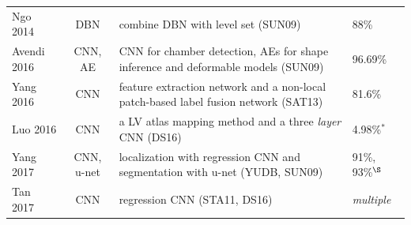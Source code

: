 \documentclass[journal]{IEEEtran}
\begin{document}
\begin{table}[!t]
\begin{minipage}{\textwidth}
\begin{tabularx}{\textwidth}{l c l l}
			Ngo 2014\cite{anh2014fully}                & DBN            & combine DBN with level set (SUN09)                                                        & 88\%                                                                                                                                                                                                                                           \\
			Avendi 2016\cite{avendi2016combined}       & CNN, AE        & CNN for chamber detection, AEs for shape inference and deformable models (SUN09)          & 96.69\%                                                                                                                                                                                                                                        \\
			Yang 2016\cite{yang2016deep}               & CNN            & feature extraction network and a non-local patch-based label fusion network (SAT13)       & 81.6\%                                                                                                                                                                                                                                         \\
			Luo 2016\cite{luo2016cardiac}              & CNN            & a LV atlas mapping method and a three \textit{layer} CNN (DS16)                           & 4.98\%$^*$                                                                                                                                                                                                                                     \\
			Yang 2017\cite{yang2017deep}               & CNN, u-net     & localization with regression CNN and segmentation with u-net (YUDB, SUN09)                & 91\%, 93\%$^\S$                                                                                                                                                                                                                                     \\
			Tan 2017\cite{tan2017convolutional}        & CNN            & regression CNN (STA11, DS16)                                                              & \textit{multiple}                                                                                                                                                                                                                                       \\

\end{tabularx}
\end{minipage}
\end{table}
\end{document}
